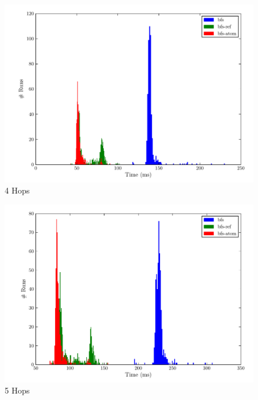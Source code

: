 \documentclass[12pt,letterpaper,oneside,notitlepage]{report}
\theoremstyle{definition}
\begin{document}
    \begin{figure}[!ht]
      \centering
      \includegraphics[scale=0.85]{4_hops}
      \caption{4 Hops}
      \label{fig:perf-4-hops}
    \end{figure}
    
    \begin{figure}[!ht]
      \centering
      \includegraphics[scale=0.85]{5_hops}
      \caption{5 Hops}
      \label{fig:perf-5-hops}
    \end{figure}
    
\end{document}

